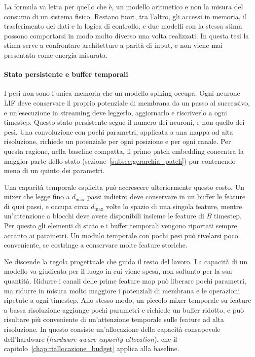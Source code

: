 La formula va letta per quello che è, un modello aritmetico e non la misura del consumo di un sistema fisico. Restano fuori, tra l'altro, gli accessi in memoria, il trasferimento dei dati e la logica di controllo, e due modelli con la stessa stima possono comportarsi in modo molto diverso una volta realizzati. In questa tesi la stima serve a confrontare architetture a parità di input, e non viene mai presentata come energia misurata.

\paragraph{Stato persistente e buffer temporali}
\label{subsec:stato_buffer}

I pesi non sono l'unica memoria che un modello spiking occupa. Ogni neurone LIF deve conservare il proprio potenziale di membrana da un passo al successivo, e un'esecuzione in streaming deve leggerlo, aggiornarlo e riscriverlo a ogni timestep. Questo stato persistente segue il numero dei neuroni, e non quello dei pesi. Una convoluzione con pochi parametri, applicata a una mappa ad alta risoluzione, richiede un potenziale per ogni posizione e per ogni canale. Per questa ragione, nella baseline compatta, il primo patch embedding concentra la maggior parte dello stato (sezione~\ref{subsec:gerarchia_patch}) pur contenendo meno di un quinto dei parametri.

Una capacità temporale esplicita può accrescere ulteriormente questo costo. Un mixer che legge fino a $d_{\max}$ passi indietro deve conservare in un buffer le feature di quei passi, e occupa circa $d_{\max}$ volte lo spazio di una singola feature, mentre un'attenzione a blocchi deve avere disponibili insieme le feature di $B$ timestep. Per questo gli elementi di stato e i buffer temporali vengono riportati sempre accanto ai parametri. Un modulo temporale con pochi pesi può rivelarsi poco conveniente, se costringe a conservare molte feature storiche.

Ne discende la regola progettuale che guida il resto del lavoro. La capacità di un modello va giudicata per il luogo in cui viene spesa, non soltanto per la sua quantità. Ridurre i canali delle prime feature map può liberare pochi parametri, ma ridurre in misura molto maggiore i potenziali di membrana e le operazioni ripetute a ogni timestep. Allo stesso modo, un piccolo mixer temporale su feature a bassa risoluzione aggiunge pochi parametri e richiede un buffer ridotto, e può risultare più conveniente di un'attenzione temporale sulle feature ad alta risoluzione. In questo consiste un'allocazione della capacità consapevole dell'hardware (\emph{hardware-aware capacity allocation}), che il capitolo~\ref{chap:riallocazione_budget} applica alla baseline.

